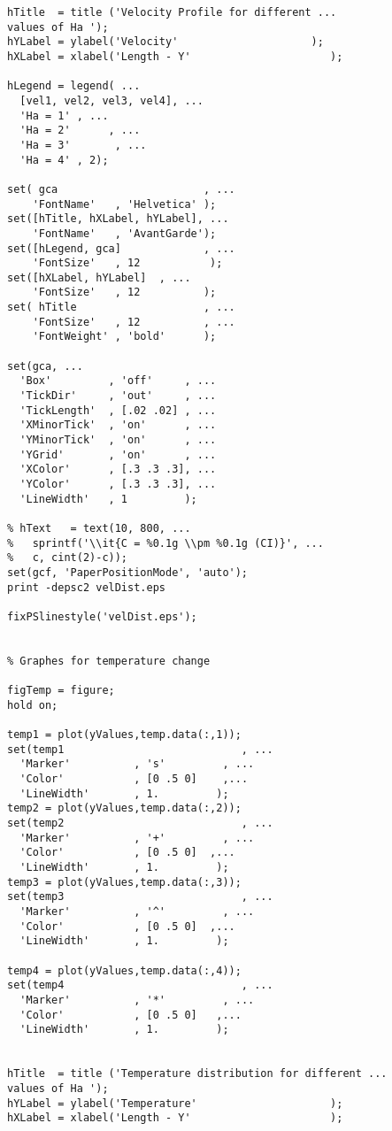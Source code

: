 \begin{lstlisting}
hTitle  = title ('Velocity Profile for different ...
values of Ha ');
hYLabel = ylabel('Velocity'                     );
hXLabel = xlabel('Length - Y'                      );

hLegend = legend( ...
  [vel1, vel2, vel3, vel4], ...
  'Ha = 1' , ...
  'Ha = 2'      , ...
  'Ha = 3'       , ...
  'Ha = 4' , 2);

set( gca                       , ...
    'FontName'   , 'Helvetica' );
set([hTitle, hXLabel, hYLabel], ...
    'FontName'   , 'AvantGarde');
set([hLegend, gca]             , ...
    'FontSize'   , 12           );
set([hXLabel, hYLabel]  , ...
    'FontSize'   , 12          );
set( hTitle                    , ...
    'FontSize'   , 12          , ...
    'FontWeight' , 'bold'      );

set(gca, ...
  'Box'         , 'off'     , ...
  'TickDir'     , 'out'     , ...
  'TickLength'  , [.02 .02] , ...
  'XMinorTick'  , 'on'      , ...
  'YMinorTick'  , 'on'      , ...
  'YGrid'       , 'on'      , ...
  'XColor'      , [.3 .3 .3], ...
  'YColor'      , [.3 .3 .3], ...
  'LineWidth'   , 1         );

% hText   = text(10, 800, ...
%   sprintf('\\it{C = %0.1g \\pm %0.1g (CI)}', ...
%   c, cint(2)-c));
set(gcf, 'PaperPositionMode', 'auto');
print -depsc2 velDist.eps

fixPSlinestyle('velDist.eps');


% Graphes for temperature change

figTemp = figure;
hold on;

temp1 = plot(yValues,temp.data(:,1));
set(temp1                            , ...
  'Marker'          , 's'         , ...
  'Color'           , [0 .5 0]    ,...
  'LineWidth'       , 1.         );
temp2 = plot(yValues,temp.data(:,2));
set(temp2                            , ...
  'Marker'          , '+'         , ...
  'Color'           , [0 .5 0]  ,...
  'LineWidth'       , 1.         );
temp3 = plot(yValues,temp.data(:,3));
set(temp3                            , ...
  'Marker'          , '^'         , ...
  'Color'           , [0 .5 0]  ,...
  'LineWidth'       , 1.         );

temp4 = plot(yValues,temp.data(:,4));
set(temp4                            , ...
  'Marker'          , '*'         , ...
  'Color'           , [0 .5 0]   ,...
  'LineWidth'       , 1.         );


hTitle  = title ('Temperature distribution for different ...
values of Ha ');
hYLabel = ylabel('Temperature'                     );
hXLabel = xlabel('Length - Y'                      );


\end{lstlisting}
